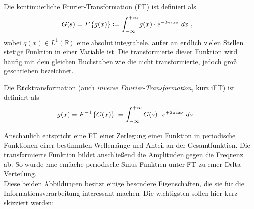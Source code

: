 
Die kontinuierliche Fourier-Transformation (FT) ist definiert als
\begin{equation}
	G(s) = F\left\{g(x)\right\}\vcentcolon=\int_{-\infty}^{+\infty} g(x) \cdot e^{-2\pi i x s} ~dx \text{~,}
	\label{eq:ft}
\end{equation}
wobei $g(x)\in L^1(\mathbb{R})$ eine absolut integrabele, außer an endlich vielen Stellen stetige Funktion in einer Variable ist. Die transformierte dieser Funktion wird häufig mit dem gleichen Buchstaben wie die nicht transformierte, jedoch groß geschrieben bezeichnet.

Die Rücktransformation (auch \textit{inverse Fourier-Transformation}, kurz iFT) ist definiert als
\begin{equation}
	g(x) = F^{-1}\left\{G(x)\right\}\vcentcolon=\int_{-\infty}^{+\infty} G(s) \cdot e^{+2\pi i x s} ~ds \text{~.}
	\label{eq:ift}
\end{equation}

Anschaulich entspricht eine FT einer Zerlegung einer Funktion in periodische Funktionen einer bestimmten Wellenlänge und Anteil an der Gesamtfunktion. Die transformierte Funktion bildet anschließend die Amplituden gegen die Frequenz ab. So würde eine einfache periodische Sinus-Funktion unter FT zu einer Delta-Verteilung.\\

Diese beiden Abbildungen besitzt einige besondere Eigenschaften, die sie für die Informationsverarbeitung interessant machen. Die wichtigsten sollen hier kurz skizziert werden:

